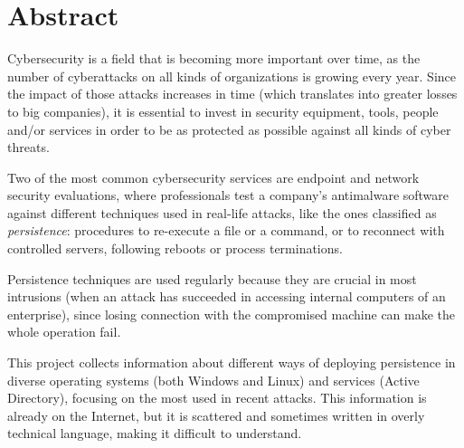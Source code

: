 \section*{Abstract} 

Cybersecurity is a field that is becoming more important over time, as the number of cyberattacks on all kinds of organizations is growing every year. 
Since the impact of those attacks increases in time (which translates into greater losses to big companies), 
it is essential to invest in security equipment, tools, people and/or services in order to be as protected as possible against all kinds of cyber threats.



Two of the most common cybersecurity services are endpoint and network security evaluations, where professionals test a company's antimalware software against different techniques used in real-life attacks, like the ones classified as \textit{persistence}: procedures to re-execute a file or a command, or to reconnect with controlled servers, following reboots or process terminations. 

Persistence techniques are used regularly because they are crucial in most intrusions (when an attack has succeeded in accessing internal computers of an enterprise), since losing connection with the compromised machine can make the whole operation fail.

This project collects information about different ways of deploying persistence in diverse operating systems (both Windows and Linux) and services (Active Directory), focusing on the most used in recent attacks. This information is already on the Internet, but it is scattered and sometimes written in overly technical language, making it difficult to understand.  

